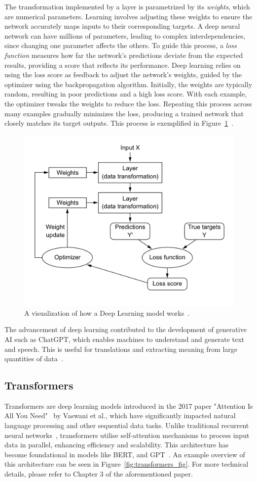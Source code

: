 \documentclass[licencjacka,en]{pracamgr}
\begin{document}
The transformation implemented by a layer is parametrized by its \textit{weights}, which are numerical parameters. Learning involves adjusting these weights to ensure the network accurately maps inputs to their corresponding targets. A deep neural network can have millions of parameters, leading to complex interdependencies, since changing one parameter affects the others. To guide this process, a \textit{loss function} measures how far the network's predictions deviate from the expected results, providing a score that reflects its performance. Deep learning relies on using the loss score as feedback to adjust the network's weights, guided by the optimizer using the backpropagation algorithm. Initially, the weights are typically random, resulting in poor predictions and a high loss score. With each example, the optimizer tweaks the weights to reduce the loss. Repeating this process across many examples gradually minimizes the loss, producing a trained network that closely matches its target outputs. This process is exemplified in Figure~\ref{fig:nn_function}~\cite{francuz_9}.

\begin{figure}
    \centering
    \includegraphics[width=0.5\linewidth]{bachelor_images/nn_function.png}
    \caption{A visualization of how a Deep Learning model works~\cite{francuz_9}.}
    \label{fig:nn_function}
\end{figure}

The advancement of deep learning contributed to the development of generative AI such as ChatGPT, which enables machines to understand and generate text and speech. This is useful for translations and extracting meaning from large quantities of data~\cite{ibm_dl}.

\subsection{Transformers}
Transformers are deep learning models introduced in the 2017 paper "Attention Is All You Need"~\cite{attention} by Vaswani et al., which have significantly impacted natural language processing and other sequential data tasks. Unlike traditional recurrent neural networks~\cite{RNN}, transformers utilise self-attention mechanisms to process input data in parallel, enhancing efficiency and scalability. This architecture has become foundational in models like BERT, and GPT~\cite{medium_t}. An example overview of this architecture can be seen in Figure~\ref{fig:transformers_fig}. For more technical details, please refer to Chapter 3 of the aforementioned paper.
\end{document}
